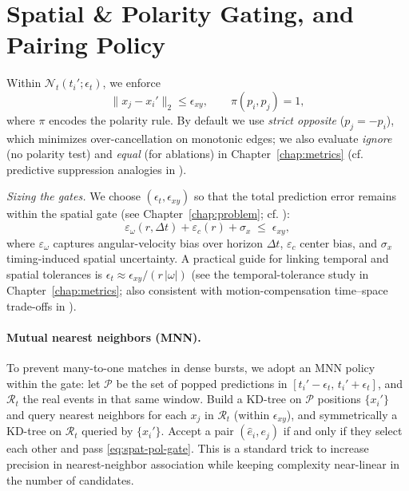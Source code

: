 \section{Spatial \& Polarity Gating, and Pairing Policy}
Within $\mathcal{N}_t(t_i';\epsilon_t)$, we enforce
\begin{equation}
\|x_j - x_i'\|_2 \le \epsilon_{xy}, 
\qquad \pi(p_i,p_j)=1,
\label{eq:spat-pol-gate}
\end{equation}
where $\pi$ encodes the polarity rule. By default we use \emph{strict opposite} ($p_j=-p_i$), which minimizes over-cancellation on monotonic edges; we also evaluate \emph{ignore} (no polarity test) and \emph{equal} (for ablations) in Chapter~\ref{chap:metrics} (cf. predictive suppression analogies in \cite{Hosoya2005RetinaPC,Rao1999V1PC}).
\medskip

\noindent \textit{Sizing the gates.} We choose $(\epsilon_t,\epsilon_{xy})$ so that the total prediction error remains within the spatial gate (see Chapter~\ref{chap:problem}; cf. \cite{Gallego2018CMax,Xu2020TCI}):
\begin{equation}
\varepsilon_{\omega}(r,\Delta t) + \varepsilon_c(r) + \sigma_x \;\le\; \epsilon_{xy},
\label{eq:gate-sizing}
\end{equation}
where $\varepsilon_{\omega}$ captures angular-velocity bias over horizon $\Delta t$, $\varepsilon_c$ center bias, and $\sigma_x$ timing-induced spatial uncertainty. A practical guide for linking temporal and spatial tolerances is $\epsilon_t\!\approx\!\epsilon_{xy}/(r\,|\omega|)$ (see the temporal-tolerance study in Chapter~\ref{chap:metrics}; also consistent with motion-compensation time–space trade-offs in \cite{Gallego2018CMax,Xu2020TCI}).

\paragraph{Mutual nearest neighbors (MNN).}
To prevent many-to-one matches in dense bursts, we adopt an MNN policy within the gate: let $\mathcal{P}$ be the set of popped predictions in $[t_i'-\epsilon_t,\,t_i'+\epsilon_t]$, and $\mathcal{R}_t$ the real events in that same window. Build a KD-tree on $\mathcal{P}$ positions $\{x_i'\}$ and query nearest neighbors for each $x_j$ in $\mathcal{R}_t$ (within $\epsilon_{xy}$), and symmetrically a KD-tree on $\mathcal{R}_t$ queried by $\{x_i'\}$. Accept a pair $(\hat e_i,e_j)$ if and only if they select each other and pass \eqref{eq:spat-pol-gate}. This is a standard trick to increase precision in nearest-neighbor association while keeping complexity near-linear in the number of candidates.

